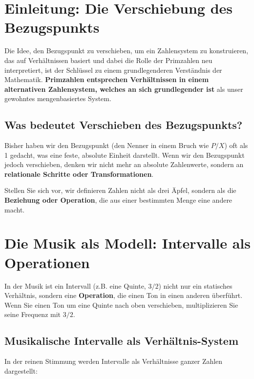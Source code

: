 \documentclass[11pt,a4paper]{article}
\begin{document}
	\newpage
	
	\section{Einleitung: Die Verschiebung des Bezugspunkts}
	
	Die Idee, den Bezugspunkt zu verschieben, um ein Zahlensystem zu konstruieren, das auf Verhältnissen basiert und dabei die Rolle der Primzahlen neu interpretiert, ist der Schlüssel zu einem grundlegenderen Verständnis der Mathematik. \textbf{Primzahlen entsprechen Verhältnissen in einem alternativen Zahlensystem, welches an sich grundlegender ist} als unser gewohntes mengenbasiertes System.
	
	\subsection{Was bedeutet Verschieben des Bezugspunkts?}
	
	Bisher haben wir den Bezugspunkt (den Nenner in einem Bruch wie $P/X$) oft als 1 gedacht, was eine feste, absolute Einheit darstellt. Wenn wir den Bezugspunkt jedoch verschieben, denken wir nicht mehr an absolute Zahlenwerte, sondern an \textbf{relationale Schritte oder Transformationen}.
	
	Stellen Sie sich vor, wir definieren Zahlen nicht als drei Äpfel, sondern als die \textbf{Beziehung oder Operation}, die aus einer bestimmten Menge eine andere macht.
	
	\section{Die Musik als Modell: Intervalle als Operationen}
	
	In der Musik ist ein Intervall (z.B. eine Quinte, $3/2$) nicht nur ein statisches Verhältnis, sondern eine \textbf{Operation}, die einen Ton in einen anderen überführt. Wenn Sie einen Ton um eine Quinte nach oben verschieben, multiplizieren Sie seine Frequenz mit $3/2$.
	
	\subsection{Musikalische Intervalle als Verhältnis-System}
	
	In der reinen Stimmung werden Intervalle als Verhältnisse ganzer Zahlen dargestellt:
	
\end{document}
